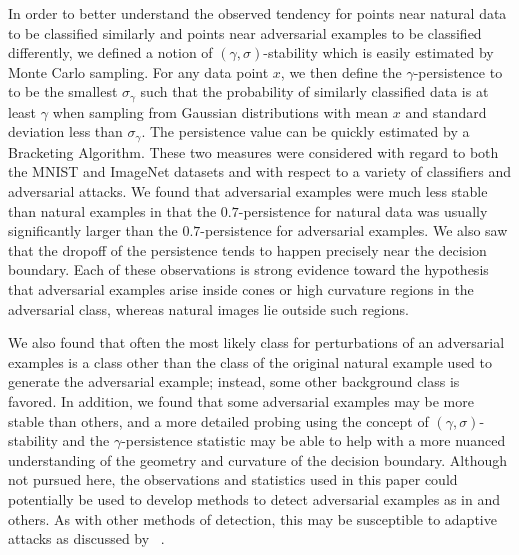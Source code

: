 

In order to better understand the observed tendency for points near natural data to be classified similarly and points near
adversarial examples to be classified differently, we defined a notion of $(\gamma,\sigma)$-stability which is easily estimated by Monte Carlo sampling. For any data point $x$, we then define the $\gamma$-persistence to to be the smallest $\sigma_\gamma$ such that the probability of similarly classified data is at least $\gamma$ when sampling from Gaussian distributions with mean $x$ and standard deviation less than $\sigma_\gamma$. The persistence value can be quickly estimated by a Bracketing Algorithm. These two measures were considered with regard to both the MNIST and ImageNet datasets and with respect to a variety of classifiers and adversarial attacks. We found that adversarial examples were much less stable than natural examples in that the $0.7$-persistence for natural data was usually significantly larger than the $0.7$-persistence for adversarial examples. We also saw that the dropoff of the persistence tends to happen precisely near the decision boundary. Each of these observations is strong evidence toward the hypothesis that adversarial examples arise inside cones or high curvature regions in the adversarial class, whereas natural images lie outside such regions.

We also found that often the most likely class for perturbations of an adversarial examples is a class other than the class of the original natural example used to generate the adversarial example; instead, some other background class is favored. In addition, we found that some adversarial examples may be more stable than others, and a more detailed probing using the concept of $(\gamma,\sigma)$-stability and the $\gamma$-persistence statistic may be able to help with a more nuanced understanding of the geometry and curvature of the decision boundary. Although not pursued here, the observations and statistics used in this paper could potentially be used to develop methods to detect adversarial examples as in \cite{crecchi2019,frosst2018,hosseini2019odds,Lee2018ASU,qin2020,roth19aodds} and others. As with other methods of detection, this may be susceptible to adaptive attacks as discussed by ~\cite{tramer2020adaptive}. 




